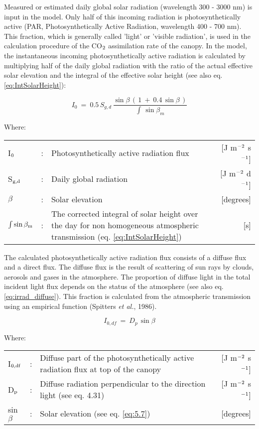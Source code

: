 Measured or estimated daily global solar radiation  (wavelength 300 - 3000 nm) is input
in the model. Only half of this incoming radiation is photosynthetically active (PAR,
Photosynthetically Active Radiation, wavelength 400 - 700 nm). This fraction, which is
generally called 'light' or 'visible radiation', is used in the calculation procedure of the
CO$_{{\rm 2}}$ assimilation rate of the canopy. In the model, the instantaneous incoming 
photosynthetically active radiation is calculated by multiplying half of the daily global radiation
with the ratio of the actual effective solar elevation and the integral of the effective solar
height (see also eq. \ref{eq:IntSolarHeight}):

\begin{equation}
\label{eq:5.8}
I _{0} ~=~ 0.5\, S _{g,d} \,{\frac{\sin \beta \, (\, 1~+~0.4\, \sin \beta \, )}{\int \, \sin \beta _{m} }}
\end{equation}

Where:\\[5pt]
\begin{tabularx}{\textwidth}{llXr}
I$_{{\rm 0}}$ &:& Photosynthetically active radiation flux    &    
    [J m$^{{\rm -2}}$ s$^{{\rm -1}}$]\\
S$_{{\rm g,d}}$ &:& Daily global radiation   &     
    [J m$^{{\rm -2}}$ d$^{{\rm -1}}$] \\
$\beta$ &:& Solar elevation    &    [degrees]\\
$\int \sin \beta_{{\rm m}}$ &:& The corrected integral of solar height over the day 
    for non homogeneous atmospheric transmission (eq. \ref{eq:IntSolarHeight})   
    &     [s]\\
\end{tabularx}

The calculated photosynthetically active radiation flux consists of a diffuse flux and a
direct flux. The diffuse flux is the result of scattering of sun rays by clouds, aerosols and
gases in the atmosphere. The proportion of diffuse light in the total incident light flux
depends on the status of the atmosphere (see also eq. \ref{eq:irrad_diffuse}). This fraction 
is calculated from the atmospheric transmission using an empirical function (Spitters 
{\it et al.}, 1986).

\begin{equation}
I_{0,df} ~=~ D _{p~} \sin \beta
\end{equation}

Where:\\[5pt]
\begin{tabularx}{\textwidth}{llXr}
I$_{{\rm 0,df}}$ &:& Diffuse part of the photosynthetically active radiation flux 
   at top of the canopy    &    [J m$^{{\rm -2}}$ s$^{{\rm -1}}$]\\
D$_{{\rm p}}$ &:& Diffuse radiation perpendicular to the direction 
   light (see eq. 4.31)    &    [J m$^{{\rm -2}}$ s$^{{\rm -1}}$]\\
sin$\beta$ &:& Solar elevation (see eq. \ref{eq:5.7})    &    [degrees]\\
\end{tabularx}

